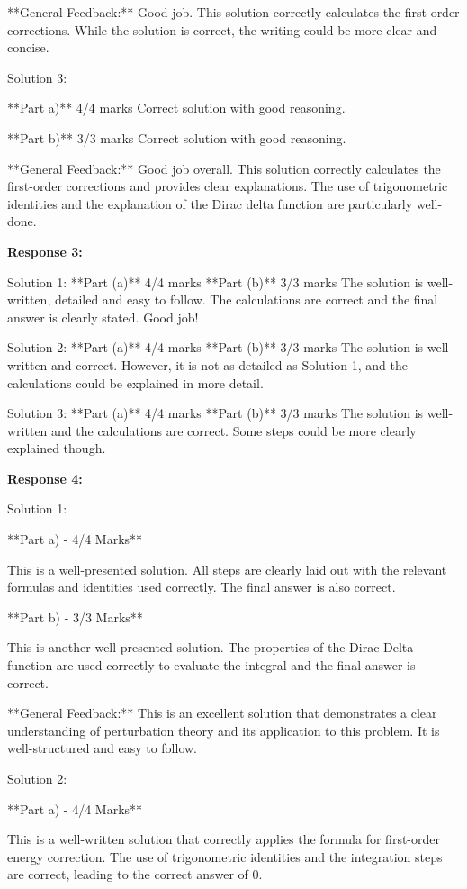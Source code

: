 \documentclass[a4paper,11pt]{article}
\begin{document}
**General Feedback:** Good job. This solution correctly calculates the first-order corrections. While the solution is correct, the writing could be more clear and concise.

Solution 3:

**Part a)** 4/4 marks
Correct solution with good reasoning.

**Part b)** 3/3 marks
Correct solution with good reasoning.

**General Feedback:** Good job overall. This solution correctly calculates the first-order corrections and provides clear explanations. The use of trigonometric identities and the explanation of the Dirac delta function are particularly well-done.

\bigskip    
\textbf{Response 3:}

Solution 1:
**Part (a)** 4/4 marks
**Part (b)** 3/3 marks
The solution is well-written, detailed and easy to follow. The calculations are correct and the final answer is clearly stated. Good job!

Solution 2:
**Part (a)** 4/4 marks
**Part (b)** 3/3 marks
The solution is well-written and correct. However, it is not as detailed as Solution 1, and the calculations could be explained in more detail.

Solution 3:
**Part (a)** 4/4 marks
**Part (b)** 3/3 marks
The solution is well-written and the calculations are correct. Some steps could be more clearly explained though. 

\bigskip    
\textbf{Response 4:}

Solution 1:

**Part a) - 4/4 Marks**

This is a well-presented solution. All steps are clearly laid out with the relevant formulas and identities used correctly. The final answer is also correct.

**Part b) - 3/3 Marks**

This is another well-presented solution. The properties of the Dirac Delta function are used correctly to evaluate the integral and the final answer is correct.

**General Feedback:** This is an excellent solution that demonstrates a clear understanding of perturbation theory and its application to this problem. It is well-structured and easy to follow.

Solution 2:

**Part a) - 4/4 Marks**

This is a well-written solution that correctly applies the formula for first-order energy correction. The use of trigonometric identities and the integration steps are correct, leading to the correct answer of 0.
\end{document}
